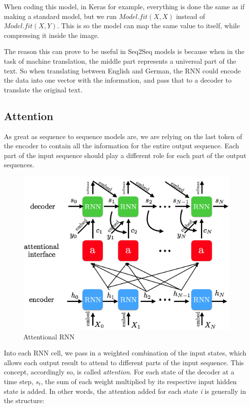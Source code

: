 \documentclass{article}
\begin{document}
When coding this model, in Keras for example, everything is done the same as if making a standard model, but we run $Model.fit(X,X)$ instead of $Model.fit(X,Y)$. This is so the model can map the same value to itself, while compressing it inside the image.

The reason this can prove to be useful in Seq2Seq models is because when in the task of machine translation, the middle part represents a universal part of the text. So when translating between English and German, the RNN could encode the data into one vector with the information, and pass that to a decoder to translate the original text.

\subsection{Attention}

As great as sequence to sequence models are, we are relying on the last token of the encoder to contain all the information for the entire output sequence. Each part of the input sequence should play a different role for each part of the output sequences. 

\begin{figure}[H]
\centering
\includegraphics[scale=.5]{attention_rnn.png}
\caption{Attentional RNN}
\label{fig:attention_rnn}
\end{figure}

Into each RNN cell, we pass in a weighted combination of the input states, which allows each output result to attend to different parts of the input sequence. This concept, accordingly so, is called \textit{attention}. For each state of the decoder at a time step, $s_{t}$, the sum of each weight multiplied by its respective input hidden state is added. In other words, the attention added for each state \textit{i} is generally in the structure:
\end{document}
